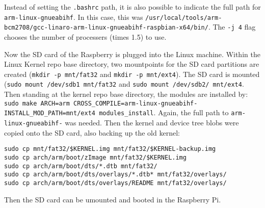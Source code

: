 \documentclass[a4paper,11pt,twoside]{article}
\begin{document}
Instead of setting the \verb+.bashrc+ path, it is also possible to indicate
the full path for \verb+arm-linux-gnueabihf+. In this case, this was
\verb+/usr/local/tools/arm-bcm2708/gcc-linaro-arm-linux-gnueabihf-raspbian-x64/bin/+.
The \verb+-j 4+ flag chooses the number of processers (times 1.5) to use.

Now the SD card of the Raspberry is plugged into the Linux machine. Within
the Linux Kernel repo base directory, two mountpoints for the SD card partitions
are created (\verb+mkdir -p mnt/fat32+ and \verb+mkdir -p mnt/ext4+). The
SD card is mounted (\verb+sudo mount /dev/sdb1 mnt/fat32+ and
\verb+sudo mount /dev/sdb2/ mnt/ext4+. Then standing at the kernel repo base
directory, the modules are installed by:
\verb+sudo make ARCH=arm CROSS_COMPILE=arm-linux-gnueabihf- INSTALL_MOD_PATH=mnt/ext4 modules_install+.
Again, the full path to \verb+arm-linux-gnueabihf-+ was needed.
Then the kernel and device tree blobs were copied onto the SD card, also backing
up the old kernel:
\begin{verbatim}
sudo cp mnt/fat32/$KERNEL.img mnt/fat32/$KERNEL-backup.img
sudo cp arch/arm/boot/zImage mnt/fat32/$KERNEL.img
sudo cp arch/arm/boot/dts/*.dtb mnt/fat32/
sudo cp arch/arm/boot/dts/overlays/*.dtb* mnt/fat32/overlays/
sudo cp arch/arm/boot/dts/overlays/README mnt/fat32/overlays/
\end{verbatim}

Then the SD card can be umounted and booted in the Raspberry Pi.







\end{document}
